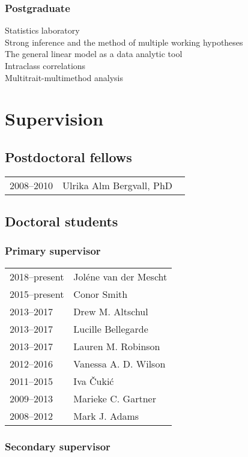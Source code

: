 \documentclass[11pt]{article}
\begin{document}
\subsubsection*{Postgraduate}
Statistics laboratory \\
Strong inference and the method of multiple working hypotheses \\
The general linear model as a data analytic tool \\
Intraclass correlations \\
Multitrait-multimethod analysis

\section*{Supervision}
\subsection*{Postdoctoral fellows}

\begin{tabular}{p{3cm}p{12cm}}
2008--2010 & Ulrika Alm Bergvall, PhD \
\end{tabular}

\subsection*{Doctoral students}

\subsubsection*{Primary supervisor}
\begin{tabular}{p{3cm}p{12cm}}
2018--present & Joléne van der Mescht \\
2015--present & Conor Smith \\
2013--2017 & Drew M. Altschul \\
2013--2017 & Lucille Bellegarde \\
2013--2017 & Lauren M. Robinson \\
2012--2016 & Vanessa A. D. Wilson \\
2011--2015 & Iva Čukić \\
2009--2013 & Marieke C. Gartner \\
2008--2012 & Mark J. Adams
\end{tabular}

\subsubsection*{Secondary supervisor}
\end{document}

